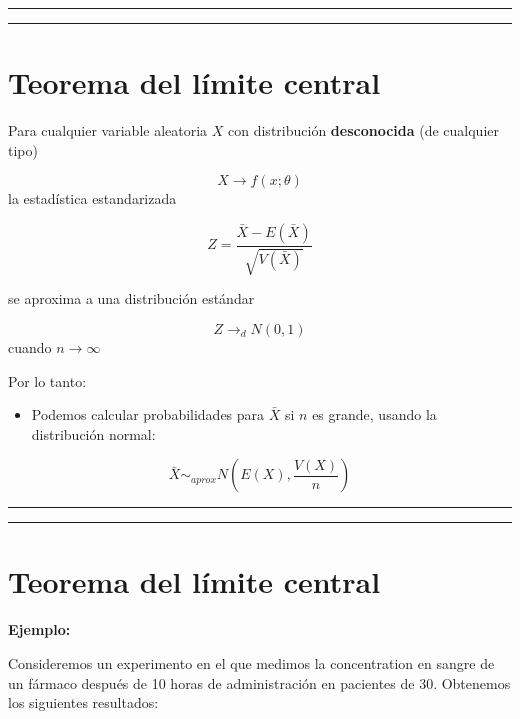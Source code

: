 \documentclass[
]{book}
\providecommand{\tightlist}{%
  \setlength{\itemsep}{0pt}\setlength{\parskip}{0pt}}
\begin{document}
\begin{center}\rule{0.5\linewidth}{0.5pt}\end{center}

\begin{center}\rule{0.5\linewidth}{0.5pt}\end{center}

\hypertarget{teorema-del-luxedmite-central-1}{%
\section{Teorema del límite central}\label{teorema-del-luxedmite-central-1}}

Para cualquier variable aleatoria \(X\) con distribución \textbf{desconocida} (de cualquier tipo)

\[X \rightarrow f(x; \theta)\]
la estadística estandarizada

\[Z=\frac{\bar{X}-E(\bar{X})}{\sqrt{V(\bar{X})}}\]

se aproxima a una distribución estándar

\[Z \rightarrow_d N(0,1)\] cuando \(n\rightarrow \infty\)

Por lo tanto:

\begin{itemize}
\tightlist
\item
  Podemos calcular probabilidades para \(\bar{X}\) si \(n\) es grande, usando la distribución normal:
\end{itemize}

\[\bar{X} \sim_{aprox} N(E(X), \frac{V(X)}{n})\]

\begin{center}\rule{0.5\linewidth}{0.5pt}\end{center}

\begin{center}\rule{0.5\linewidth}{0.5pt}\end{center}

\hypertarget{teorema-del-luxedmite-central-2}{%
\section{Teorema del límite central}\label{teorema-del-luxedmite-central-2}}

\textbf{Ejemplo:}

Consideremos un experimento en el que medimos la concentration en sangre de un fármaco después de 10 horas de administración en pacientes de \(30\). Obtenemos los siguientes resultados:
\end{document}

